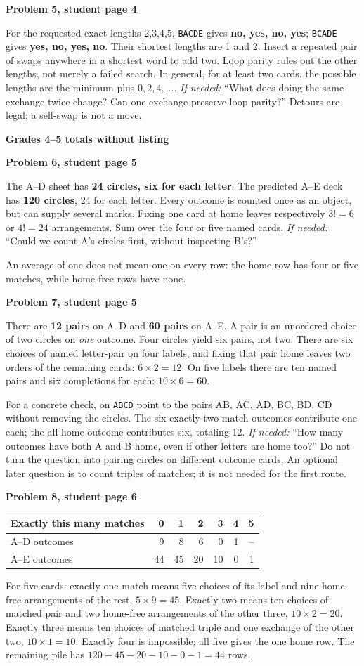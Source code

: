 \documentclass[11pt]{article}
\newcommand{\head}[1]{\par\textbf{\large #1}\par}
\newcommand{\sub}[1]{\par\textbf{#1}\par}
\newcommand{\row}[1]{\texttt{#1}}
\newcommand{\hint}[1]{\emph{If needed:} #1}
\begin{document}
\sub{Problem 5, student page 4}
For the requested exact lengths 2,3,4,5, \row{BACDE} gives \textbf{no, yes, no, yes}; \row{BCADE} gives \textbf{yes, no, yes, no}. Their shortest lengths are 1 and 2. Insert a repeated pair of swaps anywhere in a shortest word to add two. Loop parity rules out the other lengths, not merely a failed search. In general, for at least two cards, the possible lengths are the minimum plus $0,2,4,\ldots$. \hint{``What does doing the same exchange twice change? Can one exchange preserve loop parity?''} Detours are legal; a self-swap is not a move.
\newpage
\head{Grades 4--5 totals without listing}
\sub{Problem 6, student page 5}
The A--D sheet has \textbf{24 circles, six for each letter}. The predicted A--E deck has \textbf{120 circles}, 24 for each letter. Every outcome is counted once as an object, but can supply several marks. Fixing one card at home leaves respectively $3!=6$ or $4!=24$ arrangements. Sum over the four or five named cards. \hint{``Could we count A's circles first, without inspecting B's?''}

An average of one does not mean one on every row: the home row has four or five matches, while home-free rows have none.

\sub{Problem 7, student page 5}
There are \textbf{12 pairs} on A--D and \textbf{60 pairs} on A--E. A pair is an unordered choice of two circles on \emph{one} outcome. Four circles yield six pairs, not two. There are six choices of named letter-pair on four labels, and fixing that pair home leaves two orders of the remaining cards: $6\times2=12$. On five labels there are ten named pairs and six completions for each: $10\times6=60$.

For a concrete check, on \row{ABCD} point to the pairs AB, AC, AD, BC, BD, CD without removing the circles. The six exactly-two-match outcomes contribute one each; the all-home outcome contributes six, totaling 12. \hint{``How many outcomes have both A and B home, even if other letters are home too?''} Do not turn the question into pairing circles on different outcome cards. An optional later question is to count triples of matches; it is not needed for the first route.

\sub{Problem 8, student page 6}
\begin{center}\renewcommand{\arraystretch}{1.3}
\begin{tabular}{lrrrrrr}
Exactly this many matches & 0&1&2&3&4&5\\\midrule
A--D outcomes &9&8&6&0&1&--\\
A--E outcomes &44&45&20&10&0&1
\end{tabular}
\end{center}
For five cards: exactly one match means five choices of its label and nine home-free arrangements of the rest, $5\times9=45$. Exactly two means ten choices of matched pair and two home-free arrangements of the other three, $10\times2=20$. Exactly three means ten choices of matched triple and one exchange of the other two, $10\times1=10$. Exactly four is impossible; all five gives the one home row. The remaining pile has $120-45-20-10-0-1=44$ rows.
\end{document}

